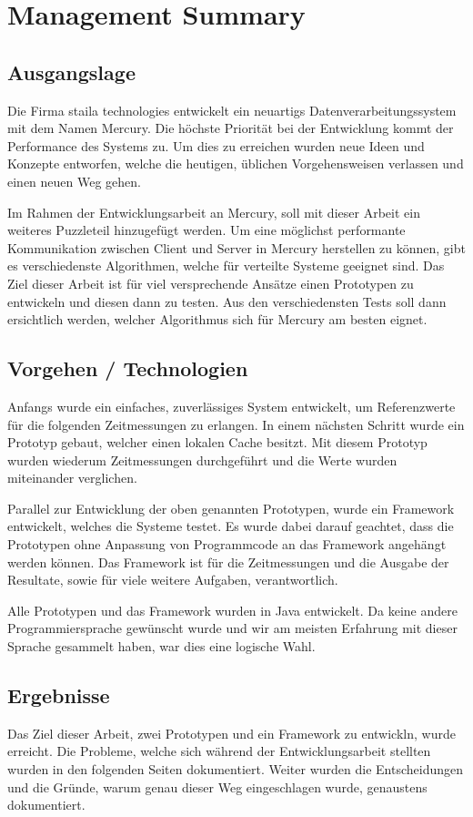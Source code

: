 \chapter*{Management Summary}

\section*{Ausgangslage}
Die Firma staila technologies entwickelt ein neuartigs Datenverarbeitungssystem mit dem Namen Mercury. Die höchste Priorität bei der Entwicklung kommt der Performance des Systems zu. Um dies zu erreichen wurden neue Ideen und Konzepte entworfen, welche die heutigen, üblichen Vorgehensweisen verlassen und einen neuen Weg gehen.

Im Rahmen der Entwicklungsarbeit an Mercury, soll mit dieser Arbeit ein weiteres Puzzleteil hinzugefügt werden. Um eine möglichst performante Kommunikation zwischen Client und Server in Mercury herstellen zu können, gibt es verschiedenste Algorithmen, welche für verteilte Systeme geeignet sind. Das Ziel dieser Arbeit ist für viel versprechende Ansätze einen Prototypen zu entwickeln und diesen dann zu testen. Aus den verschiedensten Tests soll dann ersichtlich werden, welcher Algorithmus sich für Mercury am besten eignet.

\section*{Vorgehen / Technologien}
Anfangs wurde ein einfaches, zuverlässiges System entwickelt, um Referenzwerte für die folgenden Zeitmessungen zu erlangen. In einem nächsten Schritt wurde ein Prototyp gebaut, welcher einen lokalen Cache besitzt. Mit diesem Prototyp wurden wiederum Zeitmessungen durchgeführt und die Werte wurden miteinander verglichen.

Parallel zur Entwicklung der oben genannten Prototypen, wurde ein Framework entwickelt, welches die Systeme testet. Es wurde dabei darauf geachtet, dass die Prototypen ohne Anpassung von Programmcode an das Framework angehängt werden können. Das Framework ist für die Zeitmessungen und die Ausgabe der Resultate, sowie für viele weitere Aufgaben, verantwortlich.

Alle Prototypen und das Framework wurden in Java entwickelt. Da keine andere Programmiersprache gewünscht wurde und wir am meisten Erfahrung mit dieser Sprache gesammelt haben, war dies eine logische Wahl.
\section*{Ergebnisse}
Das Ziel dieser Arbeit, zwei Prototypen und ein Framework zu entwickln, wurde erreicht. Die Probleme, welche sich während der Entwicklungsarbeit stellten wurden in den folgenden Seiten dokumentiert. Weiter wurden die Entscheidungen und die Gründe, warum genau dieser Weg eingeschlagen wurde, genaustens dokumentiert.

